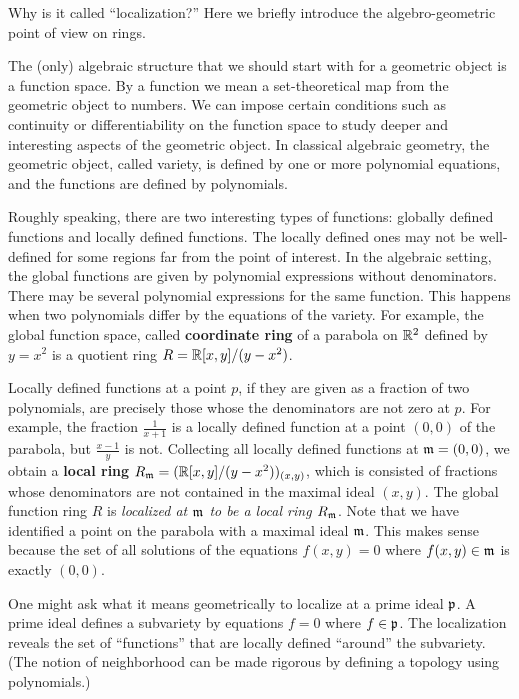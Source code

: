 Why is it called ``localization?''
Here we briefly introduce the algebro-geometric point of view on rings.

The (only) algebraic structure that we should start with for a geometric object is a function space.
By a function we mean a set-theoretical map from the geometric object to numbers.
We can impose certain conditions such as continuity or differentiability
on the function space to study deeper and interesting aspects of the geometric object.
In classical algebraic geometry, the geometric object, called variety,
is defined by one or more polynomial equations,
and the functions are defined by polynomials.

Roughly speaking, there are two interesting types of functions:
globally defined functions and locally defined functions.
The locally defined ones may not be well-defined for some regions far from the point of interest.
In the algebraic setting, the global functions are given by
polynomial expressions without denominators.
There may be several polynomial expressions for the same function.
This happens when two polynomials differ by the equations of the variety.
For example, the global function space, called {\bf coordinate ring}
of a parabola on $\mathbb{R}^2$ defined by $y = x^2$ is a quotient ring $R = \mathbb{R}[x,y]/(y-x^2)$.

Locally defined functions at a point $p$, if they are given as a fraction of two polynomials,
are precisely those whose the denominators are not zero at $p$.
For example, the fraction $\frac{1}{x+1}$ is a locally defined function at a point $(0,0)$ of the parabola,
but $\frac{x-1}{y}$ is not.
Collecting all locally defined functions at $\mathfrak{m} = (0,0)$, we obtain
a {\bf local ring} $R_{\mathfrak{m}} = (\mathbb{R}[x,y]/(y-x^2))_{(x,y)}$,
which is consisted of fractions whose denominators are not contained in the maximal ideal $(x,y)$.
The global function ring $R$ is \emph{localized at $\mathfrak{m}$ to be a local ring $R_{\mathfrak{m}}$}.
Note that we have identified a point on the parabola with a maximal ideal $\mathfrak{m}$.
This makes sense because the set of all solutions 
of the equations $f(x,y)=0$ where $f(x,y) \in \mathfrak{m}$ is exactly $(0,0)$.

One might ask what it means geometrically to localize at a prime ideal $\mathfrak{p}$.
A prime ideal defines a subvariety by equations $f = 0$ where $f \in \mathfrak{p}$.
The localization reveals the set of ``functions'' that are locally defined ``around'' the subvariety.
(The notion of neighborhood can be made rigorous by defining a topology using polynomials.)




